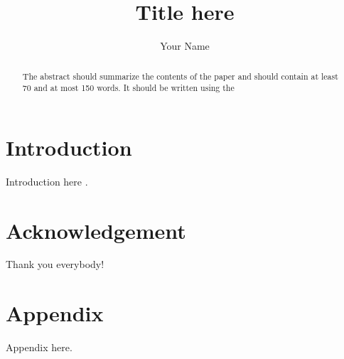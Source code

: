 \documentclass[runningheads,a4paper]{llncs}
\begin{document}
\title{Title here}

\author{Your Name}

\maketitle

\begin{abstract}
The abstract should summarize the contents of the paper and should
contain at least 70 and at most 150 words. It should be written using the
\end{abstract}

\section{Introduction}
Introduction here 
\cite{cassell2000embodied}.

\section{Acknowledgement}
Thank you everybody!




\section{Appendix}
Appendix here.
\end{document}
